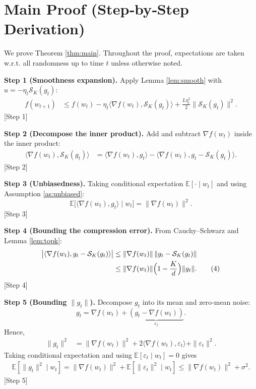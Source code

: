 \documentclass{article}
\newcommand{\topk}[1]{\mathcal{S}_K(#1)} %
\newcommand{\E}{\mathbb{E}}
\begin{document}
\section*{Main Proof (Step‑by‑Step Derivation)}
We prove Theorem \ref{thm:main}. Throughout the proof, expectations are taken w.r.t. all randomness up to time $t$ unless otherwise noted.

\noindent\textbf{Step 1 (Smoothness expansion).}  
Apply Lemma \ref{lem:smooth} with $u=-\eta_t\topk{g_t}$:
\begin{align}
f(w_{t+1}) 
&\le f(w_t) -\eta_t\langle\nabla f(w_t),\topk{g_t}\rangle 
      +\frac{L\eta_t^{2}}{2}\|\topk{g_t}\|^{2}. \tag{1}
\end{align}
[Step 1]

\noindent\textbf{Step 2 (Decompose the inner product).}  
Add and subtract $\nabla f(w_t)$ inside the inner product:
\begin{align}
\langle\nabla f(w_t),\topk{g_t}\rangle
&= \langle\nabla f(w_t),g_t\rangle 
   -\langle\nabla f(w_t),g_t-\topk{g_t}\rangle . \tag{2}
\end{align}
[Step 2]

\noindent\textbf{Step 3 (Unbiasedness).}  
Taking conditional expectation $\E[\cdot\mid w_t]$ and using Assumption \ref{as:unbiased}:
\[
\E\big[\langle\nabla f(w_t),g_t\rangle\mid w_t\big]
   =\|\nabla f(w_t)\|^{2}. \tag{3}
\]
[Step 3]

\noindent\textbf{Step 4 (Bounding the compression error).}  
From Cauchy–Schwarz and Lemma \ref{lem:topk}:
\begin{align}
\big|\langle\nabla f(w_t),g_t-\topk{g_t}\rangle\big|
&\le \|\nabla f(w_t)\|\,\|g_t-\topk{g_t}\| \nonumber\\
&\le \|\nabla f(w_t)\|\Bigl(1-\frac{K}{d}\Bigr)\|g_t\| . \tag{4}
\end{align}
[Step 4]

\noindent\textbf{Step 5 (Bounding $\|g_t\|$).}  
Decompose $g_t$ into its mean and zero‑mean noise:
\[
g_t = \nabla f(w_t) + \underbrace{(g_t-\nabla f(w_t))}_{\varepsilon_t}.
\]
Hence,
\begin{align}
\|g_t\|^{2}
&= \|\nabla f(w_t)\|^{2}+2\langle\nabla f(w_t),\varepsilon_t\rangle+\|\varepsilon_t\|^{2}.
\end{align}
Taking conditional expectation and using $\E[\varepsilon_t\mid w_t]=0$ gives
\begin{align}
\E[\|g_t\|^{2}\mid w_t] = \|\nabla f(w_t)\|^{2} + \E[\|\varepsilon_t\|^{2}\mid w_t]
                         \le \|\nabla f(w_t)\|^{2} + \sigma^{2}. \tag{5}
\end{align}
[Step 5]
\end{document}
